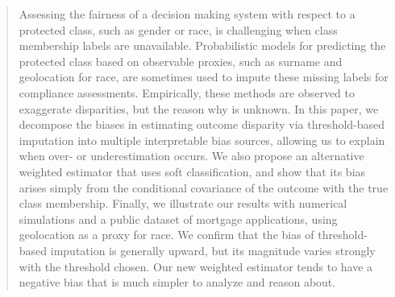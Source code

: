 \begin{abstract}
Assessing the fairness of a decision making system with respect to a protected
class, such as gender or race, is challenging when class membership labels
are unavailable.
Probabilistic models for predicting the protected class based on observable proxies,
such as surname and geolocation for race, are sometimes used to
impute these missing labels for compliance assessments.
Empirically, these methods are observed to exaggerate disparities, but the
reason why is unknown.
In this paper, we decompose the biases in estimating outcome disparity via
threshold-based imputation into multiple interpretable bias sources,
allowing us to explain when over- or underestimation occurs.
We also propose an alternative weighted estimator that uses soft classification,
and show that its bias arises simply from the conditional covariance of
the outcome with the true class membership.
Finally, we illustrate our results with numerical simulations and a public dataset 
of mortgage applications, using geolocation as a proxy for race.
We confirm that the bias of threshold-based imputation is generally upward, but its
magnitude varies strongly with the threshold chosen.
Our new weighted estimator tends to have a negative bias that is much simpler
to analyze and reason about.
\end{abstract}

